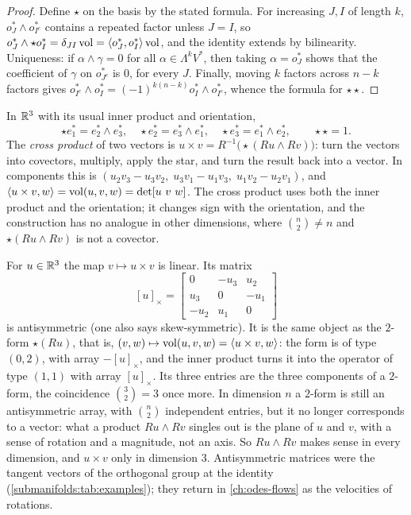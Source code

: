 \begin{notechapter}
\begin{proof}
Define $\star$ on the basis by the stated formula. For increasing
$J, I$ of length $k$, $o_J^*\wedge o_{I^c}^*$ contains a repeated
factor unless $J = I$, so
$o_J^*\wedge\star o_I^* = \delta_{JI}\operatorname{vol}
= \left\langle o_J^*, o_I^* \right\rangle\operatorname{vol}$, and the identity extends by
bilinearity. Uniqueness: if $\alpha\wedge\gamma = 0$ for all
$\alpha\in\Lambda^kV^*$, then taking $\alpha = o_J^*$ shows that the
coefficient of $\gamma$ on $o_{J^c}^*$ is $0$, for every $J$. Finally,
moving $k$ factors across $n - k$ factors gives
$o_{I^c}^*\wedge o_I^* = (-1)^{k(n-k)}o_I^*\wedge o_{I^c}^*$, whence the
formula for $\star\star$.
\end{proof}

\begin{example}\label{multilinear-algebra:ex:cross}
In $\mathbb{R}^3$ with its usual inner product and orientation,
\[
  \star e_1^* = e_2^*\wedge e_3^* ,\quad
  \star e_2^* = e_3^*\wedge e_1^* ,\quad
  \star e_3^* = e_1^*\wedge e_2^* ,\qquad \star\star = 1 .
\]
The \emph{cross product} of two vectors is
$u\times v = R^{-1}\bigl(\star(Ru\wedge Rv)\bigr)$: turn the vectors into
covectors, multiply, apply the star, and turn the result back into a
vector. In components this is
$(u_2v_3 - u_3v_2,\; u_3v_1 - u_1v_3,\; u_1v_2 - u_2v_1)$, and
$\left\langle u\times v, w \right\rangle = \operatorname{vol}(u, v, w) = \det[u\ v\ w]$. The
cross product uses both the inner product and the orientation; it
changes sign with the orientation, and the construction has no
analogue in other dimensions, where $\binom n2\neq n$ and
$\star(Ru\wedge Rv)$ is not a covector.
\end{example}

\begin{remark}
\label{multilinear-algebra:rem:hat}
For $u\in\mathbb{R}^3$ the map $v\mapsto u\times v$ is linear. Its matrix
\[
  [u]_\times = \begin{bmatrix}0 & -u_3 & u_2\\ u_3 & 0 & -u_1\\
                              -u_2 & u_1 & 0\end{bmatrix}
\]
is antisymmetric (one also says skew-symmetric). It is the same object
as the $2$-form $\star(Ru)$, that is,
$(v, w)\mapsto\operatorname{vol}(u, v, w) = \left\langle u\times v, w \right\rangle$: the
form is of type $(0, 2)$, with array $-[u]_\times$, and the inner
product turns it into the operator of type $(1, 1)$ with array
$[u]_\times$. Its three entries are the three components of a $2$-form,
the coincidence $\binom32 = 3$ once more. In dimension $n$ a $2$-form
is still an antisymmetric array, with $\binom n2$ independent entries,
but it no longer corresponds to a vector: what a product
$Ru\wedge Rv$ singles out is the plane of $u$ and $v$, with a sense of
rotation and a magnitude, not an axis. So $Ru\wedge Rv$ makes sense in
every dimension, and $u\times v$ only in dimension $3$. Antisymmetric
matrices were the tangent vectors of the
orthogonal group at the identity (\cref{submanifolds:tab:examples});
they return in \cref{ch:odes-flows} as the velocities of rotations.
\end{remark}


\end{notechapter}

